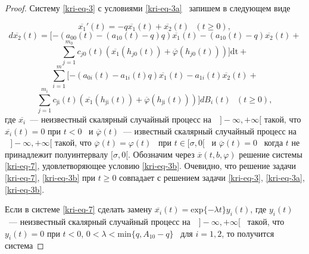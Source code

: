 \begin{proof}
Систему \eqref{kri-eq-3} с условиями \eqref{kri-eq-3a} \ запишем в следующем виде

\begin{equation*}
	\overline{x_1}'(t)=-q\overline{x_1}(t)+\overline{x_2}(t)\text{   }(t\ge 0),
\end{equation*}
\begin{equation*}
	d\overline{x_2}(t)=[-(a_{00}(t)-(a_{10}(t)-q)q)\overline{x_1}(t)-(a_{10}(t)-q)\overline{x_2}(t)+
\end{equation*}
\begin{equation}\label{kri-eq-7}
	\overset{m_0}{\underset{j=1}{\sum }}c_{\mathit{j0}}(t)(\overline{x_1}(h_{\mathit{j0}}(t))+\overline{\varphi
	}(h_{\mathit{j0}}(t)))]\text{dt}+
\end{equation}
\begin{equation*}
	\overset m{\underset{i=1}{\sum
	}}[-(a_{0i}(t)-a_{1i}(t)q)\overline{x_1}(t)-a_{1i}(t)\overline{x_2}(t)+
\end{equation*}
\begin{equation*}
	\overset{m_i}{\underset{j=1}{\sum
	}}c_{\text{ji}}(t)(\overline{x_1}(h_{\text{ji}}(t))+\overline{\varphi
	}(h_{\text{ji}}(t)))]\mathit{dB}_i(t)\text{  }(t\ge 0),
\end{equation*}
где  $\overline{x_i}$\ --- неизвестный скалярный случайный процесс на
$\text{  }]-\infty ,+\infty [$ такой, что  $\overline{x_i}(t)=0$ при
$t<0$ \ и  $\overline{\varphi }(t)$\ --- известный скалярный случайный процесс на $\text{  }]-\infty ,+\infty
[$ такой, что  $\overline{\varphi }(t)=\varphi (t)$ \ при  $t\in [\sigma ,0[$ \ и  $\overline{\varphi
}(t)=0$ \ когда  $t$ не принадлежит полуинтервалу  $[\sigma ,0[$. Обозначим через
$\overline x(t,b,\varphi )$ решение системы \eqref{kri-eq-7}, удовлетворяющее условию \eqref{kri-eq-3b}.
Очевидно, что решение задачи \eqref{kri-eq-7}, \eqref{kri-eq-3b} при  $t\ge 0$ совпадает с решением задачи \eqref{kri-eq-3}, \eqref{kri-eq-3a}, \eqref{kri-eq-3b}.

Если в системе \eqref{kri-eq-7} сделать замену  $\overline{x_i}(t)=\text{exp}\{-\mathit{\lambda t}\}y_i(t)$, где  $y_i(t)$\ ---
неизвестный скалярный случайный процесс на  $\text{  }]-\infty ,+\infty [$ \ такой, что $y_i(t)=0$ при  $t<0$,
$0<\lambda <\text{min}\{q,A_{10}-q\}$ \ для  $i=1,2$, то получится система


\end{proof}
